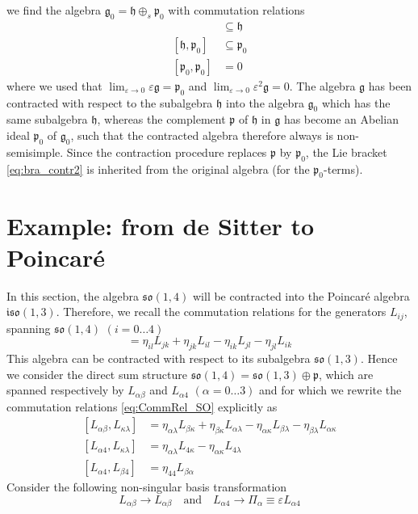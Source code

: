 \documentclass[10pt]{article}
\newcommand{\mfrak}{\mathfrak}
\begin{document}
we find the algebra $\mfrak{g}_0 = \mfrak{h} \oplus_s \mfrak{p}_0$ with 
commutation relations
\begin{align}
  [\mfrak{h},\mfrak{h}] &\subseteq \mfrak{h} \\
  [\mfrak{h},\mfrak{p}_0] &\subseteq \mfrak{p}_0 \label{eq:bra_contr2} \\
  [\mfrak{p}_0,\mfrak{p}_0] &= 0
\end{align}
where we used that $\lim_{\varepsilon \rightarrow 0} \varepsilon \mfrak{g} = 
\mfrak{p}_0$ and $\lim_{\varepsilon \rightarrow 0} \varepsilon^2 \mfrak{g} = 0$.  
The algebra $\mfrak{g}$ has been contracted with respect to the subalgebra 
$\mfrak{h}$ into the algebra $\mfrak{g}_0$ which has the same subalgebra 
$\mfrak{h}$, whereas the complement $\mfrak{p}$ of $\mfrak{h}$ in $\mfrak{g}$ 
has become an Abelian ideal $\mfrak{p}_0$ of $\mfrak{g}_0$, such that the 
contracted algebra therefore always is non-semisimple. Since the contraction 
procedure replaces $\mfrak{p}$ by $\mfrak{p}_0$, the Lie bracket 
\eqref{eq:bra_contr2} is inherited from the original algebra (for the 
$\mfrak{p}_0$-terms).


\section{Example: from de Sitter to Poincar\'e}

In this section, the algebra $\mfrak{so}(1,4)$ will be contracted into the 
Poincar\'e algebra $\mfrak{iso}(1,3)$. Therefore, we recall the commutation 
relations for the generators $L_{ij}$, spanning $\mfrak{so}(1,4)$ $(i = 0 \ldots 
4)$
\begin{equation}
  [L_{ij},L_{kl}] = \eta_{il}L_{jk} + \eta_{jk}L_{il} - \eta_{ik}L_{jl} -
  \eta_{jl}L_{ik}
  \label{eq:CommRel_SO}
\end{equation}
This algebra can be contracted with respect to its subalgebra $\mfrak{so}(1,3)$.  
Hence we consider the direct sum structure $\mfrak{so}(1,4) = 
\mfrak{so}(1,3) \oplus \mfrak{p}$, which are spanned respectively by 
$L_{\alpha\beta}$ and $L_{\alpha 4}$ $(\alpha = 0 \ldots 3)$ and for which we 
rewrite the commutation relations \eqref{eq:CommRel_SO} explicitly as
\begin{equation}\label{eq:CommRel_SO_expl}
  \begin{split}
    [L_{\alpha\beta},L_{\kappa\lambda}] &= \eta_{\alpha\lambda}L_{\beta\kappa} + 
    \eta_{\beta\kappa}L_{\alpha\lambda} - \eta_{\alpha\kappa}L_{\beta\lambda} - 
    \eta_{\beta\lambda}L_{\alpha\kappa} \\
    [L_{\alpha 4},L_{\kappa\lambda}] &= \eta_{\alpha\lambda}L_{4\kappa} - 
    \eta_{\alpha\kappa}L_{4\lambda} \\
    [L_{\alpha 4},L_{\beta 4}] &= \eta_{44}L_{\beta\alpha}
  \end{split}
\end{equation}
Consider the following non-singular basis transformation
\begin{equation}
  L_{\alpha\beta}\rightarrow L_{\alpha\beta} \quad \mathrm{and} \quad
  L_{\alpha 4}\rightarrow \Pi_\alpha \equiv \varepsilon L_{\alpha 4}
\end{equation}
\end{document}
